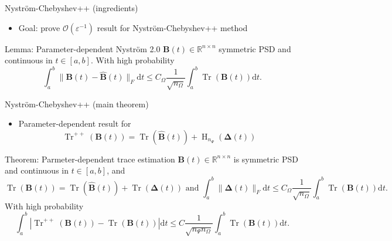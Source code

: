 \documentclass[aspectratio=169, 12pt]{beamer}
\newcommand{\mtx}[1]{\boldsymbol{#1}}
\DeclareMathOperator{\Tr}{Tr}
\DeclareMathOperator{\Hutch}{H}
\begin{document}
\begin{frame}{Nystr\"om-Chebyshev++ (ingredients)}
    \begin{itemize}
        \item Goal: prove $\mathcal{O}(\varepsilon^{-1})$ result for Nystr\"om-Chebyshev++ method
    \end{itemize}
    \begin{block}{Lemma: Parameter-dependent Nystr\"om 2.0 \cite{he2023parameter}}
        $\mtx{B}(t) \in \mathbb{R}^{n \times n}$ symmetric \gls{PSD} and
        continuous in $t \in [a, b]$. With high probability
        \begin{equation}
            \int_{a}^{b} \lVert \mtx{B}(t) - \widehat{\mtx{B}}(t) \rVert _F \mathrm{d}t \leq C_{\Omega} \frac{1}{\sqrt{n_{\Omega}}} \int_{a}^{b} \Tr(\mtx{B}(t)) \mathrm{d}t.
        \end{equation}
    \end{block}
\end{frame}

\begin{frame}{Nystr\"om-Chebyshev++ (main theorem)}
    \begin{itemize}
        \item Parameter-dependent result for \cite{meyer2021hutch}
        \begin{equation}
            \Tr^{++}(\mtx{B}(t)) = \Tr(\widehat{\mtx{B}}(t)) + \Hutch_{n_{\Psi}}(\mtx{\Delta}(t))
        \end{equation}
    \end{itemize}
    \begin{block}{Theorem: Parmeter-dependent trace estimation}
        $\mtx{B}(t) \in \mathbb{R}^{n \times n}$ is symmetric \gls{PSD}
        and continuous in $t \in [a, b]$, and
        \begin{equation}
            \Tr(\mtx{B}(t)) = \Tr(\widehat{\mtx{B}}(t)) + \Tr(\mtx{\Delta}(t)) \text{ and } \int_{a}^{b} \lVert \mtx{\Delta}(t) \rVert _F \mathrm{d}t \leq C_{\Omega} \frac{1}{\sqrt{n_{\Omega}}} \int_{a}^{b} \Tr(\mtx{B}(t)) \mathrm{d}t.
        \end{equation}
        With high probability
        \begin{equation}
            \int_{a}^{b} |\Tr^{++}(\mtx{B}(t)) - \Tr(\mtx{B}(t))| \mathrm{d}t \leq C \frac{1}{\sqrt{n_{\Psi} n_{\Omega}}} \int_{a}^{b} \Tr(\mtx{B}(t)) \mathrm{d}t.
        \end{equation}
    \end{block}
\end{frame}
\end{document}
